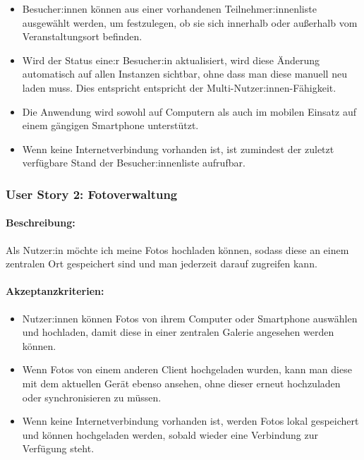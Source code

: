 \documentclass[a4paper,12pt,twoside]{scrreprt}
\begin{document}
\begin{itemize}
    \item Besucher:innen können aus einer vorhandenen Teilnehmer:innenliste ausgewählt werden, um festzulegen, ob sie sich innerhalb oder außerhalb vom Veranstaltungsort befinden.
    \item Wird der Status eine:r Besucher:in aktualisiert, wird diese Änderung automatisch auf allen Instanzen sichtbar, ohne dass man diese manuell neu laden muss. Dies entspricht entspricht der Multi-Nutzer:innen-Fähigkeit.
    \item Die Anwendung wird sowohl auf Computern als auch im mobilen Einsatz auf einem gängigen Smartphone unterstützt.
    \item Wenn keine Internetverbindung vorhanden ist, ist zumindest der zuletzt verfügbare Stand der Besucher:innenliste aufrufbar.
\end{itemize}

\subsubsection*{User Story 2: Fotoverwaltung}
\label{sub-sub-sec:user-story-2}

\paragraph*{Beschreibung:} Als Nutzer:in möchte ich meine Fotos hochladen können, sodass diese an einem zentralen Ort gespeichert sind und man jederzeit darauf zugreifen kann.

\paragraph*{Akzeptanzkriterien:}

\begin{itemize}
    \item Nutzer:innen können Fotos von ihrem Computer oder Smartphone auswählen und hochladen, damit diese in einer zentralen Galerie angesehen werden können.
    \item Wenn Fotos von einem anderen Client hochgeladen wurden, kann man diese mit dem aktuellen Gerät ebenso ansehen, ohne dieser erneut hochzuladen oder synchronisieren zu müssen.
    \item Wenn keine Internetverbindung vorhanden ist, werden Fotos lokal gespeichert und können hochgeladen werden, sobald wieder eine Verbindung zur Verfügung steht.
\end{itemize}
\end{document}
